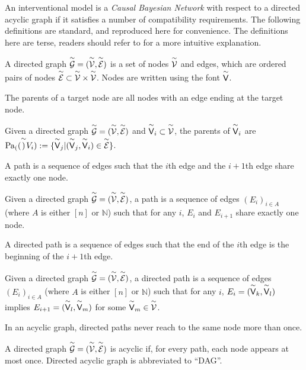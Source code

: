 An interventional model is a \emph{Causal Bayesian Network} with respect to a directed acyclic graph if it satisfies a number of compatibility requirements. The following definitions are standard, and reproduced here for convenience. The definitions here are terse, readers should refer to \citet[chap. ~1]{pearl_causality:_2009} for a more intuitive explanation.

\begin{definition}
A directed graph $\overset{\sim}{\mathcal{G}}=(\overset{\sim}{\mathcal{V}},\overset{\sim}{\mathcal{E}})$ is a set of nodes $\overset{\sim}{\mathcal{V}}$ and edges, which are ordered pairs of nodes $\overset{\sim}{\mathcal{E}}\subset \overset{\sim}{\mathcal{V}}\times\overset{\sim}{\mathcal{V}}$. Nodes are written using the font $\overset{\sim}{\mathsf{V}}$.
\end{definition}

The parents of a target node are all nodes with an edge ending at the target node.

\begin{definition}[Parents]
Given a directed graph $\overset{\sim}{\mathcal{G}}=(\overset{\sim}{\mathcal{V}},\overset{\sim}{\mathcal{E}})$ and $\overset{\sim}{\mathsf{V}}_i\subset \overset{\sim}{\mathcal{V}}$, the parents of $\overset{\sim}{\mathsf{V}}_i$ are $\text{Pa}_{(}(\overset{\sim}{\mathsf{)}}{V}_i):=\{\overset{\sim}{\mathsf{V}}_j|(\overset{\sim}{\mathsf{V}}_j,\overset{\sim}{\mathsf{V}}_i)\in\overset{\sim}{\mathcal{E}}\}$.
\end{definition}

A path is a sequence of edges such that the $i$th edge and the $i+1$th edge share exactly one node.

\begin{definition}[Path]
Given a directed graph $\overset{\sim}{\mathcal{G}}=(\overset{\sim}{\mathcal{V}},\overset{\sim}{\mathcal{E}})$, a path is a sequence of edges $(E_i)_{i\in A}$ (where $A$ is either $[n]$ or $\mathbb{N}$) such that for any $i$, $E_i$ and $E_{i+1}$ share exactly one node.
\end{definition}

A directed path is a sequence of edges such that the end of the $i$th edge is the beginning of the $i+1$th edge.

\begin{definition}
Given a directed graph $\overset{\sim}{\mathcal{G}}=(\overset{\sim}{\mathcal{V}},\overset{\sim}{\mathcal{E}})$, a directed path is a sequence of edges $(E_i)_{i\in A}$ (where $A$ is either $[n]$ or $\mathbb{N}$) such that for any $i$, $E_i=(\overset{\sim}{\mathsf{V}}_k,\overset{\sim}{\mathsf{V}}_l)$ implies $E_{i+1}=(\overset{\sim}{\mathsf{V}}_l,\overset{\sim}{\mathsf{V}}_m)$ for some $\overset{\sim}{\mathsf{V}}_m\in \overset{\sim}{\mathcal{V}}$.
\end{definition}

In an acyclic graph, directed paths never reach to the same node more than once.

\begin{definition}
A directed graph $\overset{\sim}{\mathcal{G}}=(\overset{\sim}{\mathcal{V}},\overset{\sim}{\mathcal{E}})$ is acyclic if, for every path, each node appears at most once. Directed acyclic graph is abbreviated to ``DAG''.
\end{definition}

